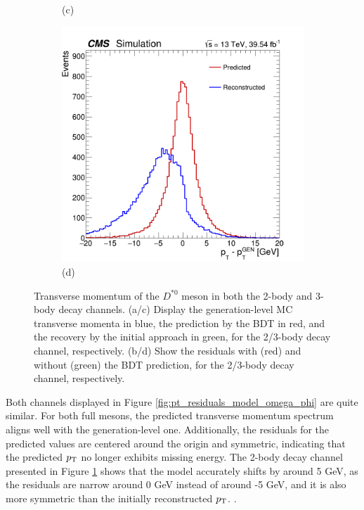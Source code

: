 \begin{myitemlist}
\begin{figure}[!ht]
\begin{subfigure}[t]{0.50\mylength}
            \caption{\footnotesize (c)}
        \end{subfigure}%
        \begin{subfigure}[t]{0.50\mylength}
            \centering
            \includegraphics[width=0.45\mylength]{resources/plots/D0Star_3body_model_pt_residuals.png}
            \caption{\footnotesize (d)}
        \end{subfigure}%
    \caption{Transverse momentum of the $D^{*0}$ meson in both the 2-body and 3-body decay channels. (a/c) Display the generation-level MC transverse momenta in blue, the prediction by the BDT in red, and the recovery by the initial approach in green, for the 2/3-body decay channel, respectively. (b/d) Show the residuals with (red) and without (green) the BDT prediction, for the 2/3-body decay channel, respectively.}
    \label{fig:pt_residuals_model_d0star}
        \vspace*{-0.0cm}
    \end{figure}

    Both channels displayed in Figure \ref{fig:pt_residuals_model_omega_phi} are quite similar. For both full mesons, the predicted transverse momentum spectrum aligns well with the generation-level one. Additionally, the residuals for the predicted values are centered around the origin and symmetric, indicating that the predicted $p_\text{T}$ no longer exhibits missing energy. The 2-body decay channel presented in Figure \ref{fig:pt_residuals_model_d0star} shows that the model accurately shifts by around 5 GeV, as the residuals are narrow around 0 GeV instead of around -5 GeV, and it is also more symmetric than the initially reconstructed $p_\text{T}$. .


\end{myitemlist}
